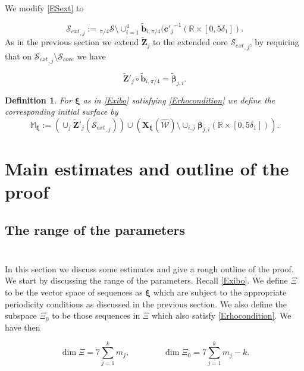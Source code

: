 \documentclass[12pt,namelimits,sumlimits]{amsart}
\newtheorem{definition}[theorem]{Definition}
\theoremstyle{remark}
\numberwithin{equation}{section}
\begin{document}
We modify \ref{ESext} to
\addtocounter{theorem}{1}
\begin{equation}
\label{ESextxi}
{{\mathcal{S}_{ext}}}_{,j}:=
{{{}_{\,\pi/4\!}\mathcal{S}}}\setminus\cup_{i=1}^4{\widetilde{\boldsymbol{b}}}_{i,\pi/4}({{\boldsymbol{c}}'_j}^{-1}({\mathbb{R}}\times[0,5\delta_1]).
\end{equation}
As in the previous section we extend ${\widetilde{\boldsymbol{Z}}}_j$ to the extended core ${{\mathcal{S}_{ext}}}_{,j}$,
by requiring that on ${{\mathcal{S}_{ext}}}_{,j}\setminus{{\mathcal{S}_{core}}}$
we have
\addtocounter{theorem}{1}
\begin{equation}
\label{EZtiwingsxi}
{\widetilde{\boldsymbol{Z}}}'_j\circ{\widetilde{\boldsymbol{b}}}_{{i,\pi/4}}
=
{\widetilde{\boldsymbol{\beta}}}_{{j,i}}.
\end{equation}

\addtocounter{equation}{1}
\begin{definition}
\label{DMxi}
For ${{\boldsymbol{\xi}}}$ as in \ref{Exibo} satisfying \ref{Erhocondition}
we define the corresponding initial surface by
$$
{\mathbb{M}}_{{\boldsymbol{\xi}}}:=
\left(\cup_j{\widetilde{\boldsymbol{Z}}}'_j({{\mathcal{S}_{ext}}}_{,j})\right)
\cup
\left({\boldsymbol{X}}_{{\boldsymbol{\xi}}}({{\widehat{{\mathcal{W}}}}})\setminus \cup_{i,j}
{\boldsymbol{\beta}}_{j,i}({\mathbb{R}}\times[0,5\delta_1])  \right).
$$
\end{definition}

\section{Main estimates and outline of the proof}
\label{Smain}
\nopagebreak

\subsection*{The range of the parameters}
$\phantom{ab}$
\nopagebreak

In this section we discuss some estimates and give a rough outline of the proof.
We start by discussing the range of the parameters.
Recall \ref{Exibo}.
We define $\Xi$ to be the vector space of sequences as ${{\boldsymbol{\xi}}}$ which are subject to the
appropriate periodicity conditions as discussed in the previous section.
We also define the subspace $\Xi_0$ to be those sequences in $\Xi$ which also satisfy
\ref{Erhocondition}.
We have then
\addtocounter{theorem}{1}
\begin{equation}
\label{EdimXi}
\dim\Xi=
7\sum_{j=1}^k m_j,
\qquad\qquad
\dim\Xi_0=
7\sum_{j=1}^k m_j-k.
\end{equation}
\end{document}
